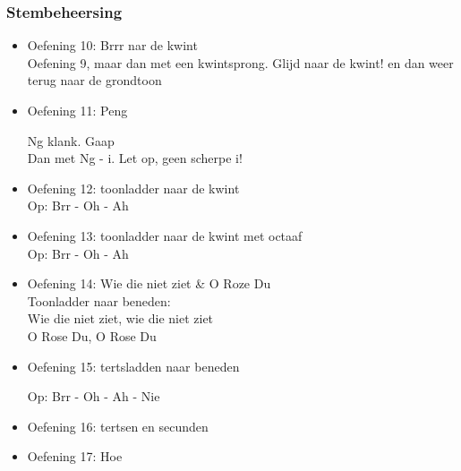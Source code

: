 \subsubsection*{Stembeheersing}
\begin{itemize}
\item Oefening 10: Brrr nar de kwint \\
Oefening 9, maar dan met een kwintsprong. Glijd naar de kwint! en dan weer terug naar de grondtoon
\item Oefening 11: Peng \\
Ng klank. Gaap\\
Dan met Ng - i. Let op, geen scherpe i!
\item Oefening 12: toonladder naar de kwint \\
Op: Brr - Oh - Ah
\item Oefening 13: toonladder naar de kwint met octaaf \\
Op: Brr - Oh - Ah
\item Oefening 14: Wie die niet ziet \& O Roze Du \\
Toonladder naar beneden: \\
Wie die niet ziet, wie die niet ziet \\
O Rose Du, O Rose Du
\item Oefening 15: tertsladden naar beneden \\
Op: Brr - Oh - Ah - Nie
\item Oefening 16: tertsen en secunden \\
\item Oefening 17: Hoe \\
\end{itemize}

\vfill

\normalsize
